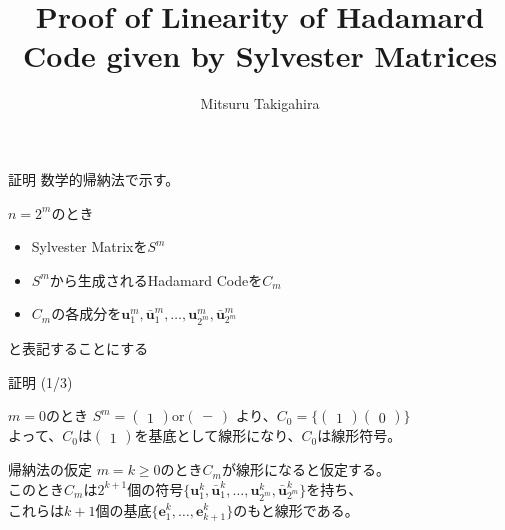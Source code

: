 \documentclass[dvipdfmx,10pt,jsarticle]{beamer}
\title{Proof of Linearity of Hadamard Code given by Sylvester Matrices}
\author{Mitsuru Takigahira}
\date[2017/10/01]{}
\begin{document}
  \frame{\maketitle}
  
  \begin{frame}{証明}
    数学的帰納法で示す。

    $n = 2^m$のとき
    \begin{itemize}
      \item Sylvester Matrixを$S^m$
      \item $S^m$から生成されるHadamard Codeを$C_m$
      \item $C_m$の各成分を$\mathbf{u}_1^m, \bar{\mathbf{u}}^m_1, \ldots , \mathbf{u}_{2^m}^m, \bar{\mathbf{u}}^m_{2^m}$
    \end{itemize}
    と表記することにする
  \end{frame}

  \begin{frame}{証明 (1/3)}
    \begin{block}{$m=0$のとき}
      $S^m = \begin{pmatrix}
        1
      \end{pmatrix} \text{or} \begin{pmatrix}
        -
      \end{pmatrix}$
      より、$C_0 = \lbrace \begin{pmatrix} 1 \end{pmatrix} \begin{pmatrix} 0 \end{pmatrix} \rbrace$ \\
      よって、$C_0$は$\begin{pmatrix} 1 \end{pmatrix}$を基底として線形になり、$C_0$は線形符号。
    \end{block}
    \begin{block}{帰納法の仮定}
      $m = k \geq 0$のとき$C_m$が線形になると仮定する。 \\
      このとき$C_m$は$2^{k+1}$個の符号$\lbrace \mathbf{u}^k_1, \bar{\mathbf{u}}^k_1, \ldots , \mathbf{u}^k_{2^m}, \bar{\mathbf{u}}^k_{2^m} \rbrace$を持ち、\\
      これらは$k + 1$個の基底$\lbrace \mathbf{e}^k_1, \ldots, \mathbf{e}^k_{k+1}\rbrace$のもと線形である。
    \end{block}
  \end{frame}
\end{document}
